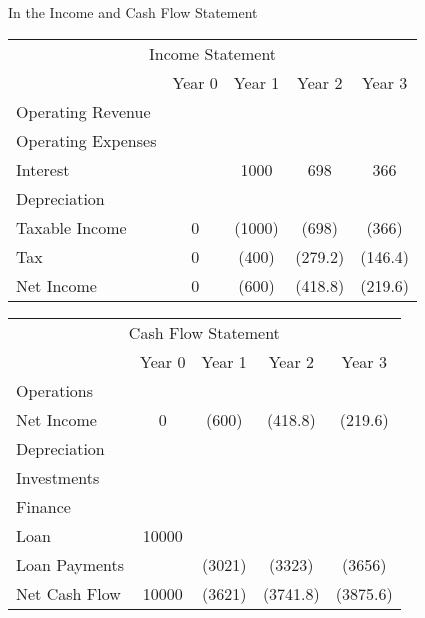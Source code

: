 \documentclass[ignorenonframetext,]{beamer}
\begin{document}
\begin{frame}{In the Income and Cash Flow Statement}

\begin{table}[h]
\begin{small}
\begin{tabular}{l||c|c|c|c|}
\multicolumn{5}{c}{Income Statement}\\
  &Year 0  &Year 1  & Year 2 & Year 3 \\
\hline
        Operating Revenue   & &     & & \\
        Operating Expenses  &   &   & & \\
        Interest    &   &   1000&698 &366 \\
        Depreciation    &   &   & & \\
        \hline
        Taxable Income  &0  &(1000) &(698) &(366) \\
        Tax &   0 & (400)   &(279.2) & (146.4) \\
        \hline
        Net Income  & 0 &(600)  & (418.8)& (219.6)\\

\end{tabular}

\begin{tabular}{l||c|c|c|c|}
        \multicolumn{5}{c}{Cash Flow Statement}\\
  &Year 0  &Year 1  & Year 2 & Year 3 \\
\hline
    Operations& &   & &\\
    \hspace{.25in}Net Income    & 0 & (600) &(418.8) &(219.6)\\
    \hspace{.25in}Depreciation  &   &   & &\\
    Investments &   &   & &\\
    Finance &   &   & &\\
    \hspace{.25in}      Loan    &   10000 & & &\\
    \hspace{.25in}      Loan    Payments&   &(3021) &(3323) &(3656)\\
        \hline
        Net Cash Flow   & 10000 & (3621)    & (3741.8)& (3875.6)\\
\end{tabular}

\end{small}
\end{table}

\end{frame}
\end{document}
